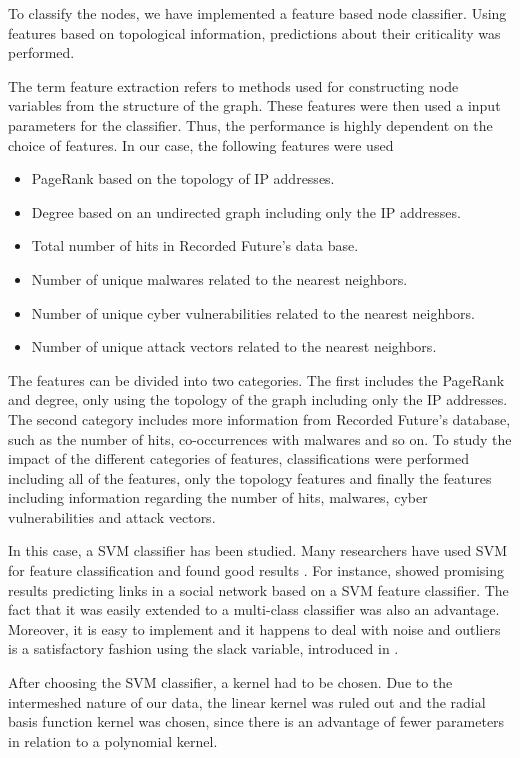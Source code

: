 To classify the nodes, we have implemented a feature based node classifier. Using features based on topological information, predictions about their criticality was performed.

The term feature extraction refers to methods used for constructing node variables from the structure of the graph. These features were then used a input parameters for the classifier. Thus, the performance is highly dependent on the choice of features. In our case, the following features were used
\begin{itemize}
    \item PageRank based on the topology of IP addresses.
    \item Degree based on an undirected graph including only the IP addresses.
    \item Total number of hits in Recorded Future's data base.
    \item Number of unique malwares related to the nearest neighbors.
    \item Number of unique cyber vulnerabilities related to the nearest neighbors.
    \item Number of unique attack vectors related to the nearest neighbors.
\end{itemize}

The features can be divided into two categories. The first includes the PageRank and degree, only using the topology of the graph including only the IP addresses. The second category includes more information from Recorded Future's database, such as the number of hits, co-occurrences with malwares and so on. To study the impact of the different categories of features, classifications were performed including all of the features, only the topology features and finally the features including information regarding the number of hits, malwares, cyber vulnerabilities and attack vectors.

In this case, a SVM classifier has been studied. Many researchers have used SVM for feature classification and found good results \citep{campbell2011}. For instance, \citet{liu2012} showed promising results predicting links in a social network based on a SVM feature classifier. The fact that it was easily extended to a multi-class classifier was also an advantage. Moreover, it is easy to implement and it happens to deal with noise and outliers is a satisfactory fashion using the slack variable, introduced in .

After choosing the SVM classifier, a kernel had to be chosen. Due to the intermeshed nature of our data, the linear kernel was ruled out and the radial basis function kernel was chosen, since there is an advantage of fewer parameters in relation to a polynomial kernel.

